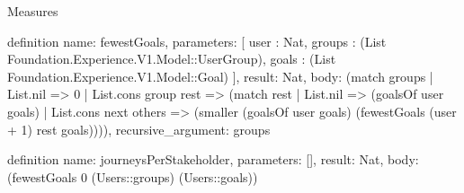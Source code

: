 \begin{lexlean}{Measures}
\begin{semanticmodule}
definition{
  name: fewestGoals,
  parameters: [
    user : Nat,
    groups : (List Foundation.Experience.V1.Model::UserGroup),
    goals : (List Foundation.Experience.V1.Model::Goal)
  ],
  result: Nat,
  body: (match groups
    | List.nil => 0
    | List.cons group rest => (match rest
      | List.nil => (goalsOf user goals)
      | List.cons next others => (smaller (goalsOf user goals) (fewestGoals (user + 1) rest goals)))),
  recursive_argument: groups
}

definition{
  name: journeysPerStakeholder,
  parameters: [],
  result: Nat,
  body: (fewestGoals 0 (Users::groups) (Users::goals))
}
\end{semanticmodule}
\end{lexlean}
